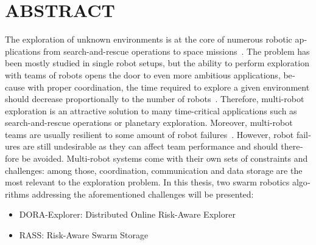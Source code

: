 %

\chapter*{ABSTRACT}\thispagestyle{headings}

\begin{otherlanguage}{english}
The exploration of unknown environments is at the core of numerous
robotic applications from search-and-rescue operations
\cite{matos2016multiple} to space
missions~\cite{fong2005interaction}. The problem has been mostly
studied in single robot setups, but the ability to perform exploration
with teams of robots opens the door to even more ambitious
applications, because with proper coordination, the time required to
explore a given environment should decrease proportionally to the
number of robots~\cite{burgard2005coordinated}. Therefore, multi-robot
exploration is an attractive solution to many time-critical
applications such as search-and-rescue operations or planetary
exploration. Moreover, multi-robot teams are usually resilient to some
amount of robot
failures~\cite{ramachandran2019resilience,wehbe2021probabilistic,winfield2006safety}. However,
robot failures are still undesirable as they can affect team
performance and should therefore be avoided. Multi-robot systems come with their own sets of constraints and
challenges: among those, coordination, communication and data storage are the most
relevant to the exploration problem. In this thesis, two swarm robotics algorithms addressing the aforementioned challenges will be presented:

\begin{itemize}
    \item DORA-Explorer: Distributed Online Risk-Aware Explorer
    \item RASS: Risk-Aware Swarm Storage
\end{itemize}


\end{otherlanguage}

